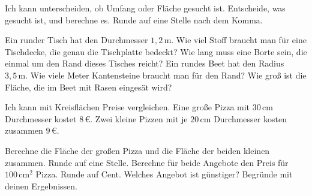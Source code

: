 \begin{aufgabe}{Ich kann unterscheiden, ob Umfang oder Fläche gesucht ist.}
Entscheide, was gesucht ist, und berechne es. Runde auf eine Stelle nach dem Komma.
\begin{teile}
\teil Ein runder Tisch hat den Durchmesser $1{,}2\,\text{m}$. Wie viel Stoff braucht man für eine Tischdecke, die genau die Tischplatte bedeckt? \hfill \leerfeld
\teil Wie lang muss eine Borte sein, die einmal um den Rand dieses Tisches reicht? \hfill \leerfeld
\teil Ein rundes Beet hat den Radius $3{,}5\,\text{m}$. Wie viele Meter Kantensteine braucht man für den Rand? \hfill \leerfeld
\teil Wie groß ist die Fläche, die im Beet mit Rasen eingesät wird? \hfill \leerfeld
\end{teile}
\end{aufgabe}

\begin{aufgabe}{Ich kann mit Kreisflächen Preise vergleichen.}
Eine große Pizza mit $30\,\text{cm}$ Durchmesser kostet $8\,€$. Zwei kleine Pizzen mit je $20\,\text{cm}$ Durchmesser kosten zusammen $9\,€$.
\begin{teile}
\teil Berechne die Fläche der großen Pizza und die Fläche der beiden kleinen zusammen. Runde auf eine Stelle.
\teil Berechne für beide Angebote den Preis für $100\,\text{cm}^2$ Pizza. Runde auf Cent.
\teil Welches Angebot ist günstiger? Begründe mit deinen Ergebnissen.
\end{teile}
\end{aufgabe}
